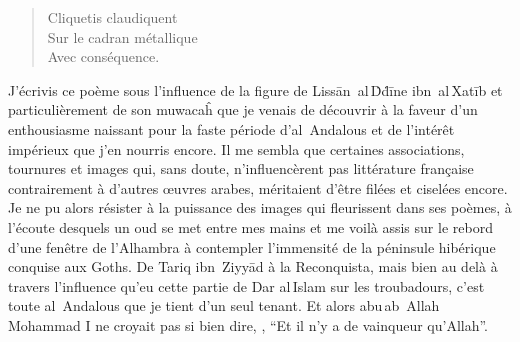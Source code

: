 
\begin{verse}
Cliquetis claudiquent\\
Sur le cadran métallique\\
Avec conséquence.
\end{verse}

\begin{prose}
J’écrivis ce poème sous l’influence de la figure de Lissān~al\,Ḋḋīne ibn~al\,Xatīb et particulièrement de son muwacaĥ  que je venais de découvrir à la faveur d’un enthousiasme naissant pour la faste période d’al~Andalous et de l’intérêt impérieux que j’en nourris encore. Il me sembla que certaines associations, tournures et images qui, sans doute, n’influencèrent pas littérature française contrairement à d’autres œuvres arabes, méritaient d’être filées et ciselées encore. Je ne pu alors résister à la puissance des images qui fleurissent dans ses poèmes, à l’écoute desquels un oud se met entre mes mains et me voilà assis sur le rebord d’une fenêtre de l’Alhambra à contempler l’immensité de la péninsule hibérique conquise aux Goths. De Tariq ibn~Ziyyād à la Reconquista, mais bien au delà à travers l’influence qu’eu cette partie de Dar al\,Islam sur les troubadours, c’est toute al~Andalous que je tient d’un seul tenant. Et alors abu\,ab~Allah Mohammad {I}\ier{} ne croyait pas si bien dire, , \enquote{Et il n’y a de vainqueur qu’Allah}.

\end{prose}

